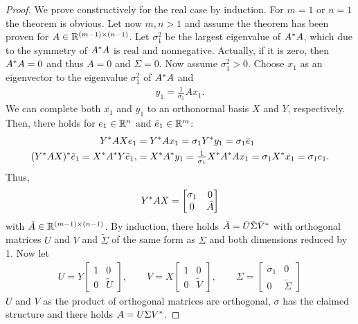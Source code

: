 \begin{proof}
  We prove constructively for the real case by induction. For $m=1$ or
  $n=1$ the theorem is obvious. Let now $m,n>1$ and assume the theorem
  has been proven for $A\in \mathbb R^{(m-1)\times (n-1)}$. Let $\sigma_1^2$
  be the largest eigenvalue of $A^* A$, which due to the symmetry of
  $A^* A$ is real and nonnegative. Actually, if it is zero, then
  $A^* A=0$ and thus $A=0$ and $\Sigma=0$. Now assume $\sigma_1^2 >
  0$. Choose $x_1$ as an eigenvector to the eigenvalue $\sigma_1^2$ of
  $A^* A$ and
  \begin{gather}
    y_1 = \frac1{\sigma_1} A x_1.
  \end{gather}
  We can complete both $x_1$ and $y_1$ to an orthonormal basis $X$ and
  $Y$, respectively. Then, there holds for $e_1 \in \mathbb R^n$ and
  $\bar e_1\in \mathbb R^m$:
  \begin{align}
    Y^* AX e_1 &= Y^* A x_1 = \sigma_1 Y^* y_1 = \sigma_1 \bar e_1\\
    (Y^* AX)^* \bar e_1 = X^* A^* Y\bar e_1,
              &= X^* A^* y_1 =  \tfrac1{\sigma_1} X^* A^* A x_1
                = \sigma_1 X^* x_1 = \sigma_1 e_1.
  \end{align}
  Thus,
  \begin{gather}
    Y^* AX =
    \begin{bmatrix}
      \sigma_1 & 0 \\ 0 & \tilde A
    \end{bmatrix}
  \end{gather}
  with $\tilde A\in \mathbb R^{(m-1)\times (n-1)}$. By induction, there holds
  $\tilde A = \tilde U \tilde \Sigma \tilde V^*$ with orthogonal
  matrices $U$ and $V$ and $\tilde\Sigma$ of the same form as $\Sigma$
  and both dimensions reduced by 1. Now let
  \begin{gather}
    U = Y
    \begin{bmatrix}
      1 & 0\\ 0& \tilde U
    \end{bmatrix},
    \qquad
    V = X
    \begin{bmatrix}
      1 & 0 \\ 0& \tilde V
    \end{bmatrix},
    \qquad
    \Sigma =
    \begin{bmatrix}
      \sigma_1 & 0 \\ 0 & \tilde\Sigma
    \end{bmatrix}
  \end{gather}
  $U$ and $V$ as the product of orthogonal matrices are orthogonal,
  $\sigma$ has the claimed structure and there holds $A=U\Sigma V^*$.
\end{proof}

